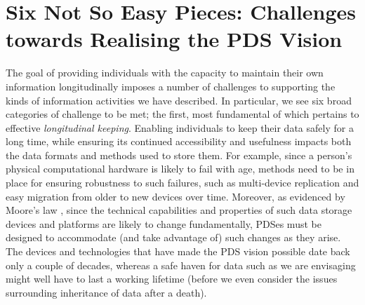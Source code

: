 \documentclass[graybox]{svmult}
\begin{document}

\section{Six Not So Easy Pieces: Challenges towards Realising the PDS Vision}


The goal of providing individuals with the capacity to maintain their own information longitudinally imposes a number of challenges to supporting the kinds of information activities we have described.  In particular, we see six broad categories of challenge to be met; the first, most fundamental of which pertains to effective \emph{longitudinal keeping}.  Enabling individuals to keep their data safely for a long time, while ensuring its continued accessibility and usefulness impacts both the data formats and methods used to store them.  For example, since a person's physical computational hardware is likely to fail with age, methods need to be in place for ensuring robustness to such failures, such as multi-device replication and easy migration from older to new devices over time.   Moreover, as evidenced by Moore's law \cite{schaller1997moore}, since the technical capabilities and properties of such data storage devices and platforms are likely to change fundamentally, PDSes must be designed to accommodate (and take advantage of) such changes as they arise. The devices and technologies that have made the PDS vision possible date back only a couple of decades, whereas a safe haven for data such as we are envisaging might well have to last a working lifetime (before we even consider the issues surrounding inheritance of data after a death).
\end{document}

